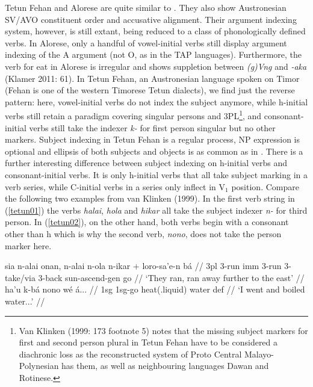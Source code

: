 Tetun Fehan and Alorese are quite similar to . They also show Austronesian SV/AVO constituent order and accusative alignment. Their argument indexing system, however, is still extant, being reduced to a class of phonologically defined verbs. In Alorese, only a handful of vowel-initial verbs still display argument indexing of the A argument (not O, as in the TAP languages). Furthermore, the verb for eat in Alorese is irregular and shows suppletion between \textit{(g)Vng} and \textit{-aka} (Klamer 2011: 61). In Tetun Fehan, an Austronesian language spoken on Timor (Fehan is one of the western Timorese Tetun dialects), we find just the reverse pattern: here, vowel-initial verbs do not index the subject anymore, while h-initial verbs still retain a paradigm covering singular persons and 3PL\footnote{Van Klinken (1999: 173 footnote 5) notes that the missing subject markers for first and second person plural in Tetun Fehan have to be considered a diachronic loss as the reconstructed system of Proto Central Malayo-Polynesian has them, as well as neighbouring languages Dawan and Rotinese.}, and consonant-initial verbs still take the indexer \textit{k-} for first person singular but no other markers. Subject indexing in Tetun Fehan is a regular process, NP expression is optional and ellipsis of both subjects and objects is as common as in . There is a further interesting difference between subject indexing on h-initial verbs and consonant-initial verbs. It is only h-initial verbs that all take subject marking in a verb series, while C-initial verbs in a series only inflect in V$_1$ position. Compare the following two examples from van Klinken (1999). In the first verb string in (\ref{tetun01}) the verbs \textit{halai}, \textit{hola} and \textit{hikar} all take the subject indexer \textit{n-} for third person. In (\ref{tetun02}), on the other hand, both verbs begin with a consonant other than h which is why the second verb, \textit{nono}, does not take the person marker here.

\ex \label{tetun01}
\begingl[glhangstyle=none]
\gla sia n-alai onan, n-alai n-ola n-ikar + loro-sa'e-n bá // 
\glb \acs{3}\acs{pl} \acs{3}-run \acs{imm} \acs{3}-run \acs{3}-take/via \acs{3}-back sun-ascend-\acs{gen} go //
\glft `They ran, ran away further to the east' // 
\endgl
\xe
\ex \label{tetun02}
\begingl
\gla ha'u k-bá nono wé á... // 
\glb \acs{1}\acs{sg} \acs{1}\acs{sg}-go heat(.liquid) water \acs{def} //
\glft `I went and boiled water...' // 
\endgl
\xe

